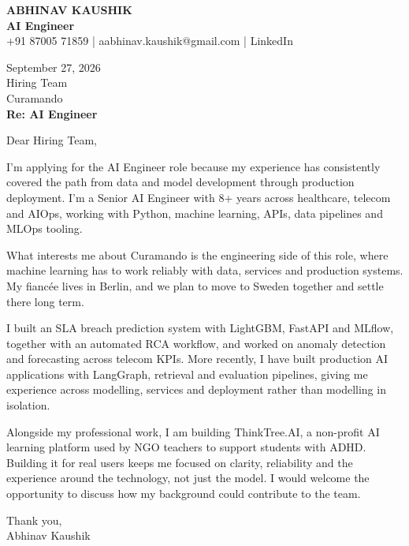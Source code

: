 \documentclass[10pt,a4paper]{article}
\begin{document}
\begin{center}
{\Large\bfseries ABHINAV KAUSHIK}\\[2pt]
{\bfseries AI Engineer}\\[2pt]
+91 87005 71859 \quad | \quad aabhinav.kaushik@gmail.com \quad | \quad LinkedIn
\end{center}
\vspace{8pt}
September 27, 2026\\[6pt]
Hiring Team\\
Curamando\\[4pt]
\textbf{Re: AI Engineer}

Dear Hiring Team,

I’m applying for the AI Engineer role because my experience has consistently covered the path from data and model development through production deployment. I’m a Senior AI Engineer with 8+ years across healthcare, telecom and AIOps, working with Python, machine learning, APIs, data pipelines and MLOps tooling.

What interests me about Curamando is the engineering side of this role, where machine learning has to work reliably with data, services and production systems. My fiancée lives in Berlin, and we plan to move to Sweden together and settle there long term.

I built an SLA breach prediction system with LightGBM, FastAPI and MLflow, together with an automated RCA workflow, and worked on anomaly detection and forecasting across telecom KPIs. More recently, I have built production AI applications with LangGraph, retrieval and evaluation pipelines, giving me experience across modelling, services and deployment rather than modelling in isolation.

Alongside my professional work, I am building ThinkTree.AI, a non-profit AI learning platform used by NGO teachers to support students with ADHD. Building it for real users keeps me focused on clarity, reliability and the experience around the technology, not just the model. I would welcome the opportunity to discuss how my background could contribute to the team.

Thank you,\\
Abhinav Kaushik
\end{document}
